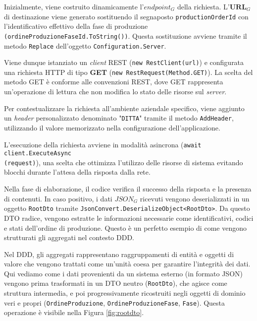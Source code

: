         \vspace{0.2 em}
        \noindent Inizialmente, viene costruito dinamicamente l'\textbf{$endpoint_G$} della richiesta. L'$\textbf{URL}_G$ di destinazione viene generato sostituendo il segnaposto \texttt{productionOrderId} con l'identificativo effettivo della fase di produzione \texttt{(ordineProduzioneFaseId.ToString())}. Questa sostituzione avviene tramite il metodo \texttt{Replace} dell'oggetto \texttt{Configuration.Server}.

        \vspace{0.2 em}
        \noindent Viene dunque istanziato un \textit{client} REST (\texttt{new RestClient(url)}) e configurata una richiesta HTTP di tipo \textbf{GET} (\texttt{new RestRequest(Method.GET)}). La scelta del metodo GET è conforme alle convenzioni REST, dove GET rappresenta un'operazione di lettura che non modifica lo stato delle risorse sul \textit{server}.

        \vspace{0.2 em}
        \noindent Per contestualizzare la richiesta all'ambiente aziendale specifico, viene aggiunto un \textit{header} personalizzato denominato "\texttt{DITTA}" tramite il metodo \texttt{AddHeader}, utilizzando il valore memorizzato nella configurazione dell'applicazione.

        \vspace{0.2 em}
        \noindent L'esecuzione della richiesta avviene in modalità asincrona (\texttt{await client.ExecuteAsync} \\ \texttt{(request)}), una scelta che ottimizza l'utilizzo delle risorse di sistema evitando blocchi durante l'attesa della risposta dalla rete.

        \vspace{0.2 em}
        \noindent Nella fase di elaborazione, il codice verifica il successo della risposta e la presenza di contenuti. In caso positivo, i dati \textbf{$JSON_G$} ricevuti vengono deserializzati in un oggetto \texttt{RootDto} tramite \texttt{JsonConvert.DeserializeObject<RootDto>}. Da questo DTO radice, vengono estratte le informazioni necessarie come identificativi, codici e stati dell'ordine di produzione. Questo è un perfetto esempio di come vengono strutturati gli aggregati nel contesto DDD. 

        \vspace{0.2 em}
        \noindent Nel DDD, gli aggregati rappresentano raggruppamenti di entità e oggetti di valore che vengono trattati come un'unità coesa per garantire l'integrità dei dati. Qui vediamo come i dati provenienti da un sistema esterno (in formato JSON) vengono prima trasformati in un DTO neutro (\texttt{RootDto}), che agisce come struttura intermedia, e poi progressivamente ricostruiti negli oggetti di dominio veri e propri (\texttt{OrdineProduzione}, \texttt{OrdineProduzioneFase}, \texttt{Fase}). Questa operazione è visibile nella Figura \ref{fig:rootdto}.


